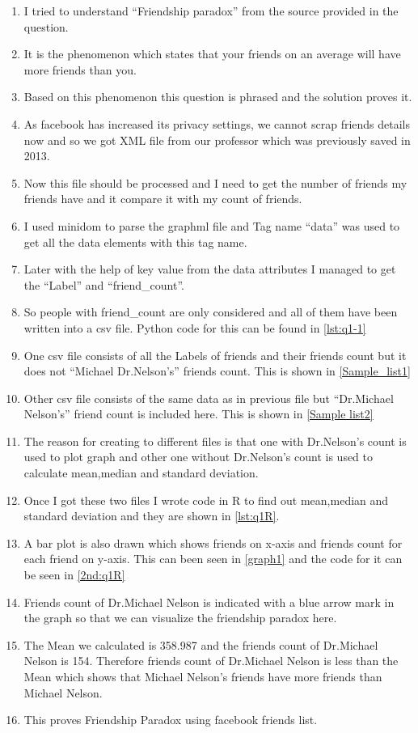 \begin{enumerate}
\item I tried to understand ``Friendship paradox'' from the source provided in the question.
\item It is the phenomenon which states that your friends on an average will have more friends than you.
\item Based on this phenomenon this question is phrased and the solution proves it.
\item As facebook has increased its privacy settings, we cannot scrap friends details now and so we got XML file from our professor which was previously saved in 2013.
\item Now this file should be processed and I need to get the number of friends my friends have and it compare it with my count of friends.
\item I used minidom to parse the graphml file and Tag name ``data'' was used to get all the data elements with this tag name.
\item Later with the help of key value from the data attributes I managed to get the ``Label'' and ``friend\_count''. 
\item So people with friend\_count are only considered and all of them have been written into a csv file. Python code for this can be found in \ref{lst:q1-1}
\item One csv file consists of all the Labels of friends and their friends count but it does not ``Michael Dr.Nelson's'' friends count. This is shown in \ref{Sample_list1}
\item Other csv file consists of the same data as in previous file but ``Dr.Michael Nelson's'' friend count is included here. This is shown in \ref{Sample list2}
\item The reason for creating to different files is that one with Dr.Nelson's count is used to plot graph and other one without Dr.Nelson's count is used to calculate mean,median and standard deviation.
\item Once I got these two files I wrote code in R to find out mean,median and standard deviation and they are shown in \ref{lst:q1R}.
\item A bar plot is also drawn which shows friends on x-axis and friends count for each friend on y-axis. This can been seen in \ref{graph1} and the code for it can be seen in \ref{2nd:q1R}
\item Friends count of Dr.Michael Nelson is indicated with a blue arrow mark in the graph so that we can visualize the friendship paradox here.
\item The Mean we calculated is 358.987 and the friends count of Dr.Michael Nelson is 154. Therefore friends count of Dr.Michael Nelson is less than the Mean which shows that Michael Nelson's friends have more friends than Michael Nelson. 
\item This proves Friendship Paradox using facebook friends list.

\end{enumerate}

